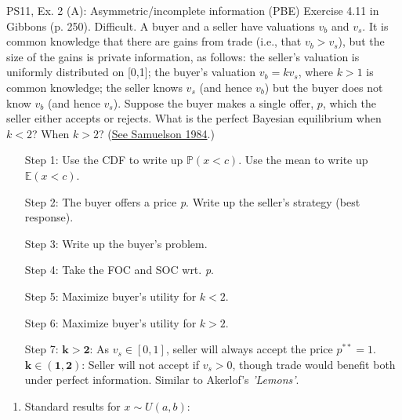 \begin{frame}{PS11, Ex. 2 (A): Asymmetric/incomplete information (PBE)}
    Exercise 4.11 in Gibbons (p. 250). Difficult. A buyer and a seller have valuations $v_b$ and $v_s$. It is common knowledge that there are gains from trade (i.e., that $v_b > v_s$), but the size of the gains is private information, as follows: the seller’s valuation is uniformly distributed on [0,1]; the buyer’s valuation $v_b = kv_s$, where $k > 1$ is common knowledge; the seller knows $v_s$ (and hence $v_b$) but the buyer does not know $v_b$ (and hence $v_s$). Suppose the buyer makes a single offer, $p$, which the seller either accepts or rejects. What is the perfect Bayesian equilibrium when $k < 2$? When $k > 2$? (\href{https://www.jstor.org/stable/1911195}{See Samuelson 1984}.) \vspace{-8pt}
    \begin{multicols}{2}
      \begin{itemize}
        \item[Step 1:] Use the CDF to write up $\mathbb{P}(x<c)$. Use the mean to write up $\mathbb{E}(x<c)$.
        \item[Step 2:] \vspace{-2pt} The buyer offers a price \textit{p}. Write up the seller's strategy (best response).
        \item[Step 3:] \vspace{-2pt} Write up the buyer's problem.
        \item[Step 4:] \vspace{-2pt} Take the FOC and SOC wrt. \textit{p}.
        \item[Step 5:] \vspace{-2pt} Maximize buyer's utility for $k<2$.
        \item[Step 6:] \vspace{-2pt} Maximize buyer's utility for $k>2$.
        \item[Step 7:] \vspace{-2pt} $\bm{k>2}$: As $v_s\in[0,1]$, seller will always accept the price $p^{**}=1$.\\
        $\bm{k\in(1,2)}$: Seller will not accept if $v_s>0$, though trade would benefit both under perfect information. Similar to Akerlof's \textit{'Lemons'}.
      \end{itemize}
      \vfill\null\columnbreak
      \begin{enumerate}
        \item \vspace{-2pt} Standard results for $x\sim U(a, b):$

\end{enumerate}
\end{multicols}
\end{frame}
